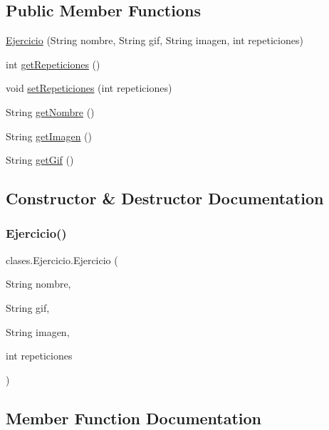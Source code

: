 \subsection*{Public Member Functions}
\begin{DoxyCompactItemize}
\item 
\mbox{\hyperlink{classclases_1_1_ejercicio_a864313fc895cf46f7b5923e91d5f3e98}{Ejercicio}} (String nombre, String gif, String imagen, int repeticiones)
\item 
int \mbox{\hyperlink{classclases_1_1_ejercicio_a20c20781a8e53729b6d2d89234b66b30}{get\+Repeticiones}} ()
\item 
void \mbox{\hyperlink{classclases_1_1_ejercicio_a032a5a0dfdf535d16a584965b9844694}{set\+Repeticiones}} (int repeticiones)
\item 
String \mbox{\hyperlink{classclases_1_1_ejercicio_af15b862fea20f083e9b3c3a761a565e5}{get\+Nombre}} ()
\item 
String \mbox{\hyperlink{classclases_1_1_ejercicio_a6af1819bc957e19d5f1cec94f4056257}{get\+Imagen}} ()
\item 
String \mbox{\hyperlink{classclases_1_1_ejercicio_af0644b86146ae1570743ac46733909bd}{get\+Gif}} ()
\end{DoxyCompactItemize}


\subsection{Constructor \& Destructor Documentation}
\mbox{\label{classclases_1_1_ejercicio_a864313fc895cf46f7b5923e91d5f3e98}} 
\subsubsection{\texorpdfstring{Ejercicio()}{Ejercicio()}}
{\footnotesize\ttfamily clases.\+Ejercicio.\+Ejercicio (\begin{DoxyParamCaption}\item[{String}]{nombre,  }\item[{String}]{gif,  }\item[{String}]{imagen,  }\item[{int}]{repeticiones }\end{DoxyParamCaption})}



\subsection{Member Function Documentation}
\mbox{\label{classclases_1_1_ejercicio_af0644b86146ae1570743ac46733909bd}} 
